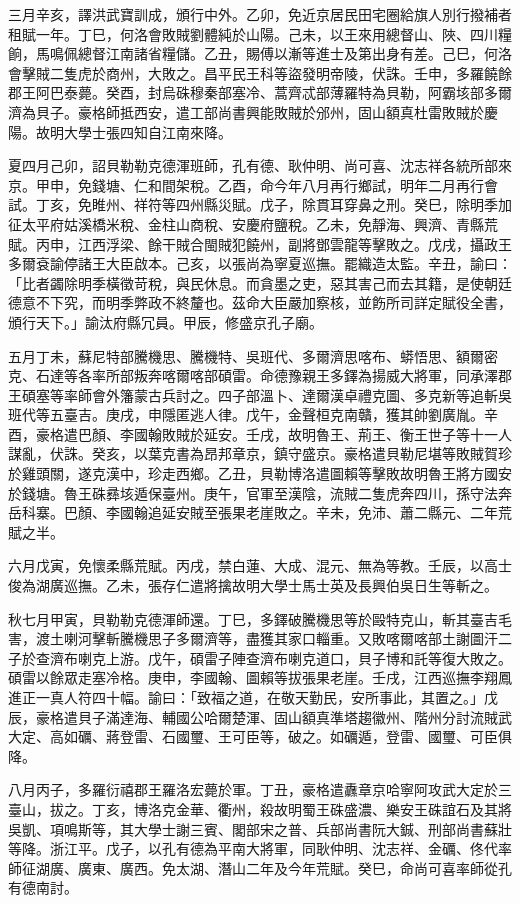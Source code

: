 \begin{pinyinscope}
三月辛亥，譯洪武寶訓成，頒行中外。乙卯，免近京居民田宅圈給旗人別行撥補者租賦一年。丁巳，何洛會敗賊劉體純於山陽。己未，以王來用總督山、陜、四川糧餉，馬鳴佩總督江南諸省糧儲。乙丑，賜傅以漸等進士及第出身有差。己巳，何洛會擊賊二隻虎於商州，大敗之。昌平民王科等盜發明帝陵，伏誅。壬申，多羅饒餘郡王阿巴泰薨。癸酉，封烏硃穆秦部塞冷、蒿齊忒部薄羅特為貝勒，阿霸垓部多爾濟為貝子。豪格師抵西安，遣工部尚書興能敗賊於邠州，固山額真杜雷敗賊於慶陽。故明大學士張四知自江南來降。

夏四月己卯，詔貝勒勒克德渾班師，孔有德、耿仲明、尚可喜、沈志祥各統所部來京。甲申，免錢塘、仁和間架稅。乙酉，命今年八月再行鄉試，明年二月再行會試。丁亥，免睢州、祥符等四州縣災賦。戊子，除貫耳穿鼻之刑。癸巳，除明季加征太平府姑溪橋米稅、金柱山商稅、安慶府鹽稅。乙未，免靜海、興濟、青縣荒賦。丙申，江西浮梁、餘干賊合閩賊犯饒州，副將鄧雲龍等擊敗之。戊戌，攝政王多爾袞諭停諸王大臣啟本。己亥，以張尚為寧夏巡撫。罷織造太監。辛丑，諭曰：「比者蠲除明季橫徵苛稅，與民休息。而貪墨之吏，惡其害己而去其籍，是使朝廷德意不下究，而明季弊政不終釐也。茲命大臣嚴加察核，並飭所司詳定賦役全書，頒行天下。」諭汰府縣冗員。甲辰，修盛京孔子廟。

五月丁未，蘇尼特部騰機思、騰機特、吳班代、多爾濟思喀布、蟒悟思、額爾密克、石達等各率所部叛奔喀爾喀部碩雷。命德豫親王多鐸為揚威大將軍，同承澤郡王碩塞等率師會外籓蒙古兵討之。四子部溫卜、達爾漢卓禮克圖、多克新等追斬吳班代等五臺吉。庚戌，申隱匿逃人律。戊午，金聲桓克南贛，獲其帥劉廣胤。辛酉，豪格遣巴顏、李國翰敗賊於延安。壬戌，故明魯王、荊王、衡王世子等十一人謀亂，伏誅。癸亥，以葉克書為昂邦章京，鎮守盛京。豪格遣貝勒尼堪等敗賊賀珍於雞頭關，遂克漢中，珍走西鄉。乙丑，貝勒博洛遣圖賴等擊敗故明魯王將方國安於錢塘。魯王硃彞垓遁保臺州。庚午，官軍至漢陰，流賊二隻虎奔四川，孫守法奔岳科寨。巴顏、李國翰追延安賊至張果老崖敗之。辛未，免沛、蕭二縣元、二年荒賦之半。

六月戊寅，免懷柔縣荒賦。丙戌，禁白蓮、大成、混元、無為等教。壬辰，以高士俊為湖廣巡撫。乙未，張存仁遣將擒故明大學士馬士英及長興伯吳日生等斬之。

秋七月甲寅，貝勒勒克德渾師還。丁巳，多鐸破騰機思等於毆特克山，斬其臺吉毛害，渡土喇河擊斬騰機思子多爾濟等，盡獲其家口輜重。又敗喀爾喀部土謝圖汗二子於查濟布喇克上游。戊午，碩雷子陣查濟布喇克道口，貝子博和託等復大敗之。碩雷以餘眾走塞冷格。庚申，李國翰、圖賴等拔張果老崖。壬戌，江西巡撫李翔鳳進正一真人符四十幅。諭曰：「致福之道，在敬天勤民，安所事此，其置之。」戊辰，豪格遣貝子滿達海、輔國公哈爾楚渾、固山額真準塔趨徽州、階州分討流賊武大定、高如礪、蔣登雷、石國璽、王可臣等，破之。如礪遁，登雷、國璽、可臣俱降。

八月丙子，多羅衍禧郡王羅洛宏薨於軍。丁丑，豪格遣纛章京哈寧阿攻武大定於三臺山，拔之。丁亥，博洛克金華、衢州，殺故明蜀王硃盛濃、樂安王硃誼石及其將吳凱、項鳴斯等，其大學士謝三賓、閣部宋之普、兵部尚書阮大鋮、刑部尚書蘇壯等降。浙江平。戊子，以孔有德為平南大將軍，同耿仲明、沈志祥、金礪、佟代率師征湖廣、廣東、廣西。免太湖、潛山二年及今年荒賦。癸巳，命尚可喜率師從孔有德南討。


\end{pinyinscope}
